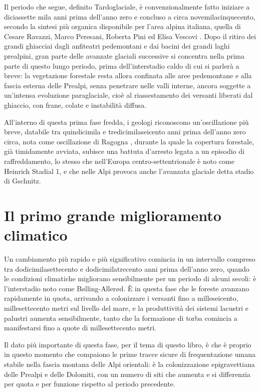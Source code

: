 Il periodo che segue, definito Tardoglaciale, è convenzionalmente fatto iniziare a diciassette mila anni prima dell'anno zero e concluso a circa novemilacinquecento, secondo la sintesi più organica disponibile per l'area alpina italiana, quella di Cesare Ravazzi, Marco Peresani, Roberta Pini ed Elisa Vescovi \citep{ravazzi2007}. Dopo il ritiro dei grandi ghiacciai dagli anfiteatri pedemontani e dai bacini dei grandi laghi prealpini, gran parte delle avanzate glaciali successive si concentra nella prima parte di questo lungo periodo, prima dell'interstadio caldo di cui si parlerà a breve: la vegetazione forestale resta allora confinata alle aree pedemontane e alla fascia esterna delle Prealpi, senza penetrare nelle valli interne, ancora soggette a un'intensa evoluzione paraglaciale, cioè al riassestamento dei versanti liberati dal ghiaccio, con frane, colate e instabilità diffusa.

All'interno di questa prima fase fredda, i geologi riconoscono un'oscillazione più breve, databile tra quindicimila e tredicimilaseicento anni prima dell'anno zero circa, nota come oscillazione di Ragogna \citep{ravazzi2005}, durante la quale la copertura forestale, già timidamente avviata, subisce una battuta d'arresto legata a un episodio di raffreddamento, lo stesso che nell'Europa centro-settentrionale è noto come Heinrich Stadial 1, e che nelle Alpi provoca anche l'avanzata glaciale detta stadio di Gschnitz.

\section{Il primo grande miglioramento climatico}

Un cambiamento più rapido e più significativo comincia in un intervallo compreso tra dodicimilasettecento e dodicimilatrecento anni prima dell'anno zero, quando le condizioni climatiche migliorano sensibilmente per un periodo di alcuni secoli: è l'interstadio noto come Bølling-Allerød. È in questa fase che le foreste avanzano rapidamente in quota, arrivando a colonizzare i versanti fino a milleseicento, millesettecento metri sul livello del mare, e la produttività dei sistemi lacustri e palustri aumenta sensibilmente, tanto che la formazione di torba comincia a manifestarsi fino a quote di millesettecento metri.

Il dato più importante di questa fase, per il tema di questo libro, è che è proprio in questo momento che compaiono le prime tracce sicure di frequentazione umana stabile nella fascia montana delle Alpi orientali: è la colonizzazione epigravettiana delle Prealpi e delle Dolomiti, con un numero di siti che aumenta e si differenzia per quota e per funzione rispetto al periodo precedente.

